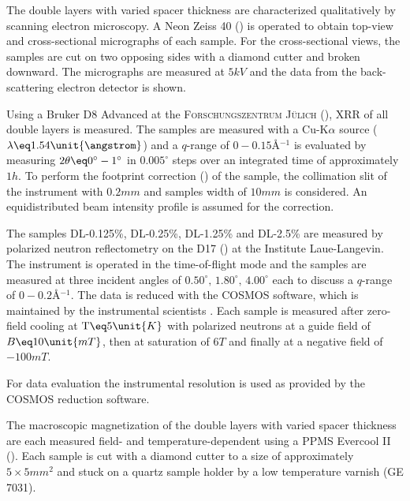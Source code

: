 \documentclass[\main/dresen_thesis.tex]{subfiles}
\begin{document}
    The double layers with varied spacer thickness are characterized qualitatively by scanning electron microscopy.
    A Neon Zeiss 40 () is operated to obtain top-view and cross-sectional micrographs of each sample.
    For the cross-sectional views, the samples are cut on two opposing sides with a diamond cutter and broken downward.
    The micrographs are measured at $5 \unit{kV}$ and the data from the back-scattering electron detector is shown.

    Using a Bruker D8 Advanced at the \textsc{Forschungszentrum J\"ulich} (), XRR of all double layers is measured.
    The samples are measured with a Cu-K$\alpha$ source ($\lambda \eq 1.54 \unit{\angstrom}$) and a $q$-range of $0 - 0.15 \unit{\angstrom^{-1}}$ is evaluated by measuring $2 \theta \eq 0^\circ - 1 ^\circ$ in $0.005 ^\circ$ steps over an integrated time of approximately $1 \unit{h}$.
    To perform the footprint correction () of the sample, the collimation slit of the instrument with $0.2 \unit{mm}$ and samples width of $10 \unit{mm}$ is considered.
    An equidistributed beam intensity profile is assumed for the correction.

    The samples DL-0.125\%, DL-0.25\%, DL-1.25\% and DL-2.5\% are measured by polarized neutron reflectometry on the D17 () at the Institute Laue-Langevin.
    The instrument is operated in the time-of-flight mode and the samples are measured at three incident angles of $0.50^\circ ,\, 1.80^\circ ,\, 4.00^\circ$ each to discuss a $q$-range of $0 - 0.2 \unit{\angstrom^{-1}}$.
    The data is reduced with the COSMOS software, which is maintained by the instrumental scientists \cite{Gutfreund_2018_Towar}.
    Each sample is measured after zero-field cooling at $\mathrm{T} \eq 5 \unit{K}$ with polarized neutrons at a guide field of $B \eq 10 \unit{mT}$, then at saturation of $6 \unit{T}$ and finally at a negative field of $-100 \unit{mT}$.

    For data evaluation the instrumental resolution is used as provided by the COSMOS reduction software.

    The macroscopic magnetization of the double layers with varied spacer thickness are each measured field- and temperature-dependent using a PPMS Evercool II ().
    Each sample is cut with a diamond cutter to a size of approximately $5 \times 5 \unit{mm^2}$ and stuck on a quartz sample holder by a low temperature varnish (GE 7031).
\end{document}
